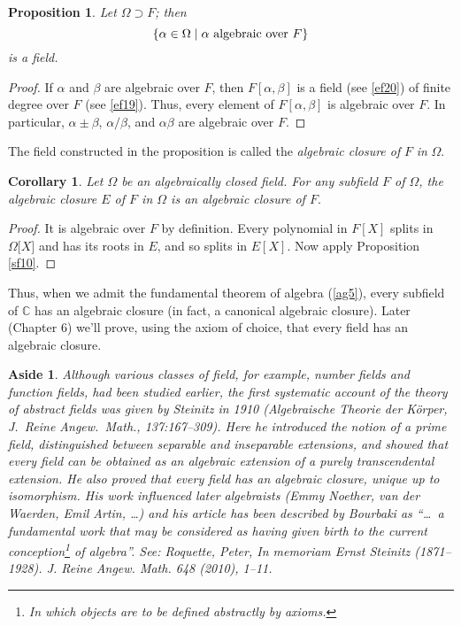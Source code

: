 \documentclass[a4paper,11pt,final,openany]{memoir}
\newtheorem{corollary}[X]{Corollary}
\newtheorem{proposition}[X]{Proposition}
\newtheorem{aside}[X]{Aside}
\theoremstyle{nonumberplain}
\newtheorem{proof}{Proof.}
\begin{document}
\begin{proposition}
\label{sf11}Let $\Omega\supset F$; then
\[
\{\alpha\in\Omega\mid\alpha\text{\textrm{\ algebraic over }}F\}
\]
is a field.
\end{proposition}

\begin{proof}
If $\alpha$ and $\beta$ are algebraic over $F$, then $F[\alpha,\beta]$ is a
field (see \ref{ef20}) of finite degree over $F$ (see \ref{ef19}). Thus, every
element of $F[\alpha,\beta]$ is algebraic over $F$. In particular, $\alpha
\pm\beta$, $\alpha/\beta$, and $\alpha\beta$ are algebraic over $F$.
\end{proof}

The field constructed in the proposition is called the \emph{algebraic closure
of}%
$F$ \emph{in} $\Omega$.

\begin{corollary}
\label{ac3}Let $\Omega$ be an algebraically closed field. For any subfield $F$
of $\Omega$, the algebraic closure $E$ of $F$ in $\Omega$ is an algebraic
closure of $F.$
\end{corollary}

\begin{proof}
It is algebraic over $F$ by definition. Every polynomial in $F[X]$ splits in
$\Omega\lbrack X]$ and has its roots in $E$, and so splits in $E[X]$. Now
apply Proposition \ref{sf10}.
\end{proof}

Thus, when we admit the fundamental theorem of algebra%
(\ref{ag5}), every subfield of $\mathbb{C}{}$ has an algebraic closure (in
fact, a canonical algebraic closure). Later (Chapter 6) we'll prove, using the
axiom of choice, that every field has an algebraic closure.

\begin{aside}
\label{ac3a}Although various classes of field, for example, number fields and
function fields, had been studied earlier, the first systematic account of the
theory of abstract fields was given by Steinitz in 1910 (Algebraische Theorie
der K\"{o}rper, J.\ Reine Angew.\ Math., 137:167--309). Here he introduced the
notion of a prime field, distinguished between separable and inseparable
extensions, and showed that every field can be obtained as an algebraic
extension of a purely transcendental extension. He also proved that every
field has an algebraic closure, unique up to isomorphism. His work influenced
later algebraists (Emmy Noether, van der Waerden, Emil Artin, \ldots) and his
article has been described by Bourbaki as \textquotedblleft\ldots\ a
fundamental work that may be considered as having given birth to the current
conception\footnote{In which objects are to be defined abstractly by axioms.}
of algebra\textquotedblright. See: Roquette, Peter, In memoriam Ernst Steinitz
(1871--1928). J. Reine Angew. Math. 648 (2010), 1--11.
\end{aside}
\end{document}
